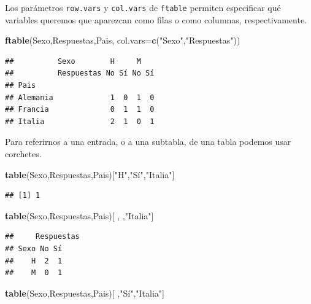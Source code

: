 \documentclass[]{book}
\newenvironment{Shaded}{\begin{snugshade}}{\end{snugshade}}
\newcommand{\DataTypeTok}[1]{\textcolor[rgb]{0.13,0.29,0.53}{#1}}
\newcommand{\KeywordTok}[1]{\textcolor[rgb]{0.13,0.29,0.53}{\textbf{#1}}}
\newcommand{\NormalTok}[1]{#1}
\newcommand{\StringTok}[1]{\textcolor[rgb]{0.31,0.60,0.02}{#1}}
\theoremstyle{definition}
\theoremstyle{definition}
\theoremstyle{definition}
\theoremstyle{remark}
\begin{document}
Los parámetros \texttt{row.vars} y \texttt{col.vars} de \texttt{ftable} permiten especificar qué variables queremos que aparezcan como filas o como columnas, respectivamente.

\begin{Shaded}
\begin{Highlighting}[]
\KeywordTok{ftable}\NormalTok{(Sexo,Respuestas,Pais, }\DataTypeTok{col.vars=}\KeywordTok{c}\NormalTok{(}\StringTok{"Sexo"}\NormalTok{,}\StringTok{"Respuestas"}\NormalTok{))}
\end{Highlighting}
\end{Shaded}

\begin{verbatim}
##          Sexo        H     M   
##          Respuestas No Sí No Sí
## Pais                           
## Alemania             1  0  1  0
## Francia              0  1  1  0
## Italia               2  1  0  1
\end{verbatim}

Para referirnos a una entrada, o a una subtabla, de una tabla podemos usar corchetes.

\begin{Shaded}
\begin{Highlighting}[]
\KeywordTok{table}\NormalTok{(Sexo,Respuestas,Pais)[}\StringTok{"H"}\NormalTok{,}\StringTok{"Sí"}\NormalTok{,}\StringTok{"Italia"}\NormalTok{]}
\end{Highlighting}
\end{Shaded}

\begin{verbatim}
## [1] 1
\end{verbatim}

\begin{Shaded}
\begin{Highlighting}[]
\KeywordTok{table}\NormalTok{(Sexo,Respuestas,Pais)[ , ,}\StringTok{"Italia"}\NormalTok{]}
\end{Highlighting}
\end{Shaded}

\begin{verbatim}
##     Respuestas
## Sexo No Sí
##    H  2  1
##    M  0  1
\end{verbatim}

\begin{Shaded}
\begin{Highlighting}[]
\KeywordTok{table}\NormalTok{(Sexo,Respuestas,Pais)[  ,}\StringTok{"Sí"}\NormalTok{,}\StringTok{"Italia"}\NormalTok{]}
\end{Highlighting}
\end{Shaded}
\end{document}
